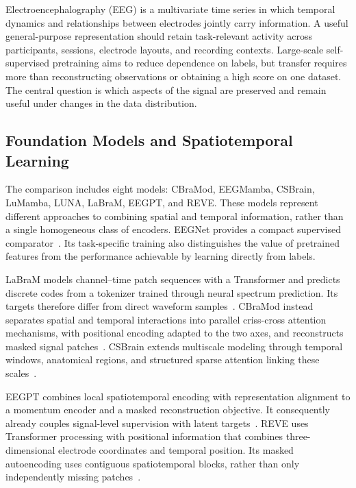 \documentclass{article}
\begin{document}
Electroencephalography (EEG) is a multivariate time series in which temporal
dynamics and relationships between electrodes jointly carry information.
A useful general-purpose representation should retain task-relevant activity
across participants, sessions, electrode layouts, and recording contexts.
Large-scale self-supervised pretraining aims to reduce dependence on labels,
but transfer requires more than reconstructing observations or obtaining a
high score on one dataset. The central question is which aspects of the
signal are preserved and remain useful under changes in the data distribution.

\subsection{Foundation Models and Spatiotemporal Learning}

The comparison includes eight models: CBraMod, EEGMamba, CSBrain,
LuMamba, LUNA, LaBraM, EEGPT, and REVE. These models represent different approaches to combining spatial and
temporal information, rather than a single homogeneous class of encoders.
EEGNet provides a compact supervised comparator~\cite{lawhern2018eegnet}.
Its task-specific training also distinguishes the value of pretrained
features from the performance achievable by learning directly from labels.

LaBraM models channel--time patch sequences with a Transformer and predicts
discrete codes from a tokenizer trained through neural spectrum prediction.
Its targets therefore differ from direct waveform samples~\cite{jiang2024labram}.
CBraMod instead separates spatial and temporal interactions into parallel
criss-cross attention mechanisms, with positional encoding adapted to the
two axes, and reconstructs masked signal patches~\cite{wang2025cbramod}.
CSBrain extends multiscale modeling through temporal windows, anatomical
regions, and structured sparse attention linking these scales~\cite{zhou2025csbrain}.

EEGPT combines local spatiotemporal encoding with representation alignment
to a momentum encoder and a masked reconstruction objective. It consequently
already couples signal-level supervision with latent targets~\cite{wang2024eegpt}.
REVE uses Transformer processing with positional information that combines
three-dimensional electrode coordinates and temporal position. Its masked
autoencoding uses contiguous spatiotemporal blocks, rather than only
independently missing patches~\cite{elouahidi2025reve}.
\end{document}
